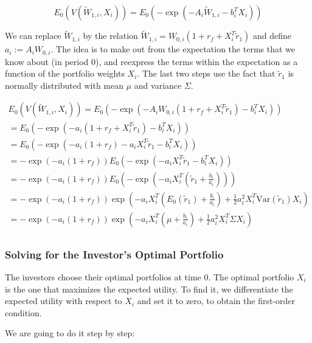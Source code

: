 \begin{equation}
    E_0(V(\tilde{W}_{1,i}, X_i)) = E_0(-\exp{(-A_i \tilde{W}_{1,i}-b_i^T X_i)})
\end{equation}

We can replace $\tilde{W}_{1,i}$ by the relation 
$\tilde{W}_{1,i} = W_{0,i}(1 + r_f + X_i^T \tilde{r}_1)$
 and define $a_i := A_i W_{0,i}$. The idea is to make out from the
expectation the terms that we know about (in period 0), and reexpress 
the terms within the expectation as a function of the
portfolio weights $X_i$. The last two steps use the fact that 
$\tilde{r}_1$ is normally distributed with mean $\mu$ and variance $\Sigma$.

\begin{equation}
    \begin{aligned}
    E_0(V(\tilde{W}_{1,i}, X_i)) = E_0(-\exp{(-A_i W_{0,i}(1 + r_f + X_i^T \tilde{r}_1)-b_i^T X_i)}) \\
    = E_0(-\exp{(-a_i(1 + r_f + X_i^T \tilde{r}_1)-b_i^T X_i)})  \\
    = E_0(-\exp{(-a_i(1 + r_f) - a_i X_i^T \tilde{r}_1 - b_i^T X_i)}) \\
    = -\exp{(-a_i(1 + r_f))} E_0(-\exp{(-a_i X_i^T \tilde{r}_1 - b_i^T X_i)}) \\
    = -\exp{(-a_i(1 + r_f))} E_0(-\exp{(-a_i X_i^T (\tilde{r}_1 + \frac{b_i}{a_i}))})  \\
    = -\exp{(-a_i (1 + r_f))} \exp{(-a_i X_i^T (E_0(\tilde{r}_1) + \frac{b_i}{a_i})+\frac{1}{2}a_i^2 X_i^T \text{Var}(\tilde{r}_1)X_i)} \\
    = -\exp{(-a_i (1 + r_f))} \exp{(-a_i X_i^T (\mu + \frac{b_i}{a_i})+\frac{1}{2}a_i^2 X_i^T \Sigma X_i)} \\
    \end{aligned}
\end{equation}

\subsubsection{Solving for the Investor's Optimal Portfolio}

The investors choose their optimal portfolios at time 0. 
The optimal portfolio $X_i$ is the one that maximizes the expected utility.
To find it, we differentiate the expected utility with respect to $X_i$ and 
set it to zero, to obtain the first-order condition.

We are going to do it step by step:

